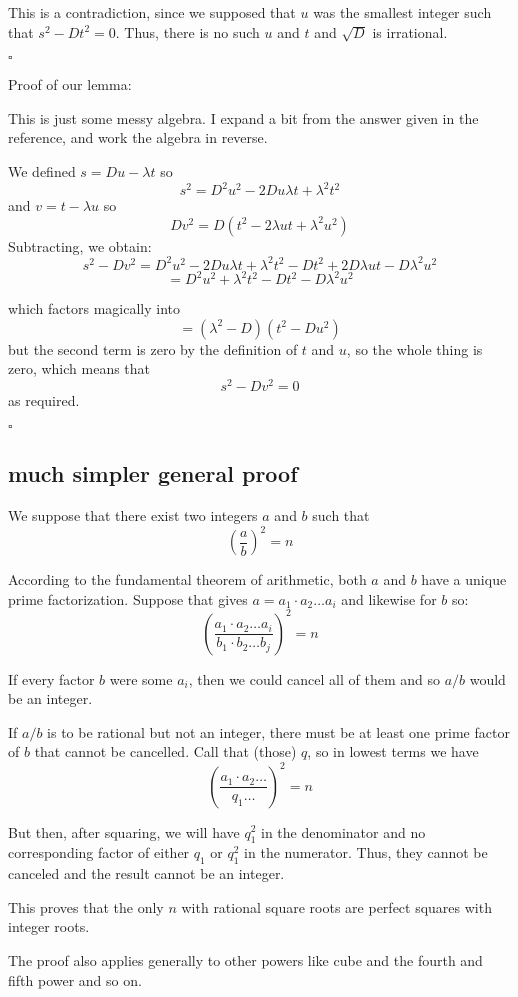 \documentclass[11pt, oneside]{article}
\begin{document}
This is a contradiction, since we supposed that $u$ was the smallest integer such that $s^2 - Dt^2 = 0$.  Thus, there is no such $u$ and $t$ and $\sqrt{D}$ is irrational.

$\square$

Proof of our lemma:

This is just some messy algebra.  I expand a bit from the answer given in the reference, and work the algebra in reverse.

We defined $s = Du - \lambda t$ so
\[ s^2 = D^2u^2 - 2Du \lambda t + \lambda^2 t^2 \]
and $v = t - \lambda u$ so
\[ Dv^2 = D (t^2 - 2 \lambda ut + \lambda^2 u^2) \]
Subtracting, we obtain:
\[ s^2 - Dv^2 = D^2u^2 - 2Du \lambda t + \lambda^2 t^2 - Dt^2 + 2D \lambda u t - D \lambda^2 u^2 \]
\[ = D^2u^2 + \lambda^2 t^2 - Dt^2 - D \lambda^2 u^2 \]

which factors magically into 
\[ = (\lambda^2 - D)(t^2 - Du^2) \]
but the second term is zero by the definition of $t$ and $u$, so the whole thing is zero, which means that 
\[ s^2 - Dv^2 = 0 \]
as required.

$\square$

\subsection*{much simpler general proof}
We suppose that there exist two integers $a$ and $b$ such that 
\[ (\frac{a}{b})^2 = n \]

According to the fundamental theorem of arithmetic, both $a$ and $b$ have a unique prime factorization.  Suppose that gives $a = a_1 \cdot a_2 \dots a_i$ and likewise for $b$ so:
\[ (\frac{a_1 \cdot a_2 \dots a_i}{b_1 \cdot b_2 \dots b_j})^2 = n \]

If every factor $b$ were some $a_i$, then we could cancel all of them and so $a/b$ would be an integer.

If $a/b$ is to be rational but not an integer, there must be at least one prime factor of $b$ that cannot be cancelled.  Call that (those) $q$, so in lowest terms we have
\[ (\frac{a_1 \cdot a_2 \dots }{q_1 \dots})^2 = n \]

But then, after squaring, we will have $q_1^2$ in the denominator and no corresponding factor of either $q_1$ or $q_1^2$ in the numerator.  Thus, they cannot be canceled and the result cannot be an integer.

This proves that the only $n$ with rational square roots are perfect squares with integer roots.

The proof also applies generally to other powers like cube and the fourth and fifth power and so on.
\end{document}
